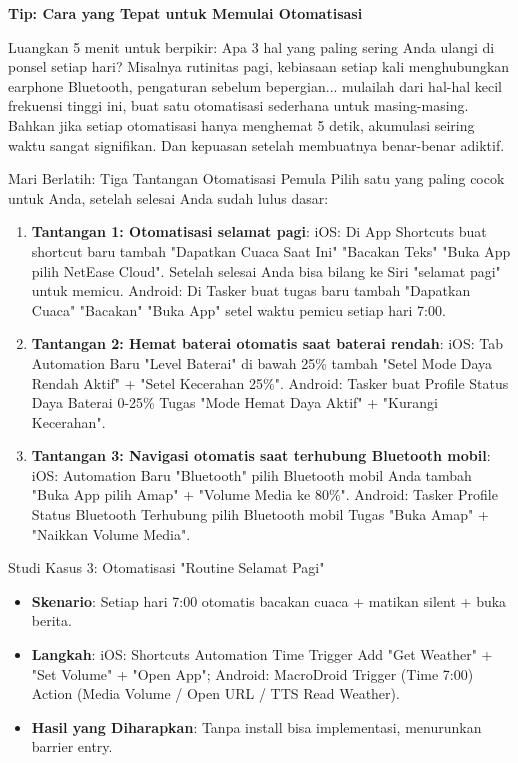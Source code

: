 \textbf{Tip: Cara yang Tepat untuk Memulai Otomatisasi}\par

Luangkan 5 menit untuk berpikir: Apa 3 hal yang paling sering Anda ulangi di ponsel setiap hari? Misalnya rutinitas pagi, kebiasaan setiap kali menghubungkan earphone Bluetooth, pengaturan sebelum bepergian... mulailah dari hal-hal kecil frekuensi tinggi ini, buat satu otomatisasi sederhana untuk masing-masing. Bahkan jika setiap otomatisasi hanya menghemat 5 detik, akumulasi seiring waktu sangat signifikan. Dan kepuasan setelah membuatnya benar-benar adiktif.

\begin{tcbpractice}{Mari Berlatih: Tiga Tantangan Otomatisasi Pemula}
Pilih satu yang paling cocok untuk Anda, setelah selesai Anda sudah lulus dasar:

\begin{enumerate}
  \item \textbf{Tantangan 1: Otomatisasi selamat pagi}: iOS: Di App Shortcuts buat shortcut baru tambah "Dapatkan Cuaca Saat Ini" "Bacakan Teks" "Buka App pilih NetEase Cloud". Setelah selesai Anda bisa bilang ke Siri "selamat pagi" untuk memicu. Android: Di Tasker buat tugas baru tambah "Dapatkan Cuaca" "Bacakan" "Buka App" setel waktu pemicu setiap hari 7:00.
  \item \textbf{Tantangan 2: Hemat baterai otomatis saat baterai rendah}: iOS: Tab Automation Baru "Level Baterai" di bawah 25\% tambah "Setel Mode Daya Rendah Aktif" + "Setel Kecerahan 25\%". Android: Tasker buat Profile Status Daya Baterai 0-25\% Tugas "Mode Hemat Daya Aktif" + "Kurangi Kecerahan".
  \item \textbf{Tantangan 3: Navigasi otomatis saat terhubung Bluetooth mobil}: iOS: Automation Baru "Bluetooth" pilih Bluetooth mobil Anda tambah "Buka App pilih Amap" + "Volume Media ke 80\%". Android: Tasker Profile Status Bluetooth Terhubung pilih Bluetooth mobil Tugas "Buka Amap" + "Naikkan Volume Media".
\end{enumerate}

\end{tcbpractice}

\begin{tcbinfo}{Studi Kasus 3: Otomatisasi "Routine Selamat Pagi"}
\begin{itemize}
  \item \textbf{Skenario}: Setiap hari 7:00 otomatis bacakan cuaca + matikan silent + buka berita.
  \item \textbf{Langkah}: iOS: Shortcuts Automation Time Trigger Add "Get Weather" + "Set Volume" + "Open App"; Android: MacroDroid Trigger (Time 7:00) Action (Media Volume / Open URL / TTS Read Weather).
  \item \textbf{Hasil yang Diharapkan}: Tanpa install bisa implementasi, menurunkan barrier entry.
\end{itemize}

\end{tcbinfo}
